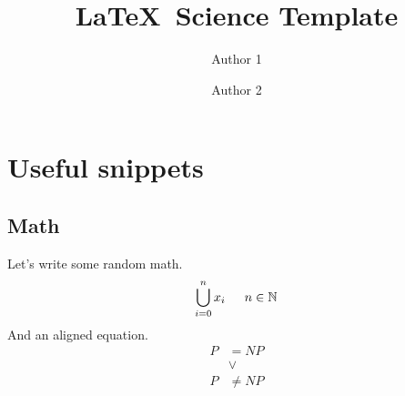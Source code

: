 \documentclass[a4paper]{article}
\begin{document}
	\title{\LaTeX\ Science Template}
	\author{Author 1 \and Author 2}
	\maketitle
	
	\pagebreak
	
	\tableofcontents
	\pagebreak
	
	\section{Useful snippets}
	\subsection{Math}
	Let's write some random math.
	\[ \bigcup_{i=0}^{n} x_i \indent n \in \mathbb{N} \]
	And an aligned equation.
	\begin{equation}
		\begin{split}
			P &= NP\\
			&\vee \\
			P&\neq NP
		\end{split}
	\end{equation}
	
\end{document}
